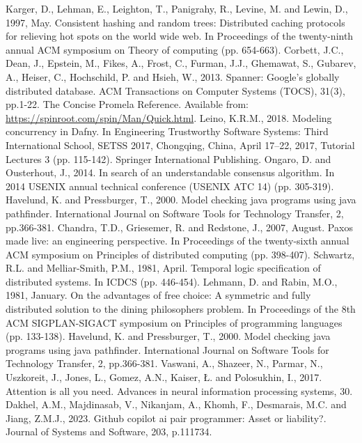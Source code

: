 \begin{thebibliography}{9}
Karger, D., Lehman, E., Leighton, T., Panigrahy, R., Levine, M. and Lewin, D., 1997, May. Consistent hashing and random trees: Distributed caching protocols for relieving hot spots on the world wide web. In Proceedings of the twenty-ninth annual ACM symposium on Theory of computing (pp. 654-663).
Corbett, J.C., Dean, J., Epstein, M., Fikes, A., Frost, C., Furman, J.J., Ghemawat, S., Gubarev, A., Heiser, C., Hochschild, P. and Hsieh, W., 2013. Spanner: Google’s globally distributed database. ACM Transactions on Computer Systems (TOCS), 31(3), pp.1-22.
The Concise Promela Reference.
Available from: \url{https://spinroot.com/spin/Man/Quick.html}.
Leino, K.R.M., 2018. Modeling concurrency in Dafny. In Engineering Trustworthy Software Systems: Third International School, SETSS 2017, Chongqing, China, April 17–22, 2017, Tutorial Lectures 3 (pp. 115-142). Springer International Publishing.
Ongaro, D. and Ousterhout, J., 2014. In search of an understandable consensus algorithm. In 2014 USENIX annual technical conference (USENIX ATC 14) (pp. 305-319).
Havelund, K. and Pressburger, T., 2000. Model checking java programs using java pathfinder. International Journal on Software Tools for Technology Transfer, 2, pp.366-381.
Chandra, T.D., Griesemer, R. and Redstone, J., 2007, August. Paxos made live: an engineering perspective. In Proceedings of the twenty-sixth annual ACM symposium on Principles of distributed computing (pp. 398-407).
Schwartz, R.L. and Melliar-Smith, P.M., 1981, April. Temporal logic specification of distributed systems. In ICDCS (pp. 446-454).
Lehmann, D. and Rabin, M.O., 1981, January. On the advantages of free choice: A symmetric and fully distributed solution to the dining philosophers problem. In Proceedings of the 8th ACM SIGPLAN-SIGACT symposium on Principles of programming languages (pp. 133-138).
Havelund, K. and Pressburger, T., 2000. Model checking java programs using java pathfinder. International Journal on Software Tools for Technology Transfer, 2, pp.366-381.
Vaswani, A., Shazeer, N., Parmar, N., Uszkoreit, J., Jones, L., Gomez, A.N., Kaiser, Ł. and Polosukhin, I., 2017. Attention is all you need. Advances in neural information processing systems, 30.
Dakhel, A.M., Majdinasab, V., Nikanjam, A., Khomh, F., Desmarais, M.C. and Jiang, Z.M.J., 2023. Github copilot ai pair programmer: Asset or liability?. Journal of Systems and Software, 203, p.111734.

\end{thebibliography}
